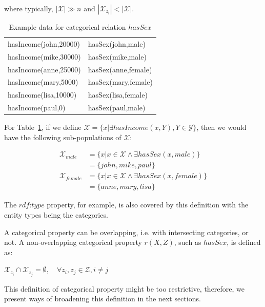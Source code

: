 where typically, $|\mathcal{X}| \gg n$ and  $|\mathcal{X}_{z_i}| < |\mathcal{X}|$.

\begin{table}[h!]
 \begin{center}
 \caption{Example data for categorical relation $hasSex$}
  \begin{tabular}{*{2}{l}}
    \toprule
    hasIncome(john,20000) & hasSex(john,male) 	\\
    hasIncome(mike,30000) & hasSex(mike,male) 	\\
    hasIncome(anne,25000) & hasSex(anne,female) 	\\
    hasIncome(mary,5000)  & hasSex(mary,female) 	\\
    hasIncome(lisa,10000) & hasSex(lisa,female)	\\
    hasIncome(paul,0)	  & hasSex(paul,male)	\\
    \bottomrule
  \end{tabular}
 \label{tab:cat1}
 \end{center}

\end{table}
  
For Table~\ref{tab:cat1}, if we define $\mathcal{X}=\{ x|\exists hasIncome(x,Y), Y \in \mathcal{Y} \}$, then we
would have the following sub-populations of $\mathcal{X}$:

\begin{align*}
 \mathcal{X}_{male}&=\{ x|x \in \mathcal{X} \wedge \exists hasSex(x,male)\} \\
  &=\{john,mike,paul\} \\
\mathcal{X}_{female}&=\{ x|x \in \mathcal{X} \wedge \exists hasSex(x,female)\} \\
  &=\{anne,mary,lisa\}
\end{align*}


The $rdf$:$type$ property, for example, is also covered by this definition with the entity types being the categories.

A categorical property can be overlapping, i.e. with intersecting categories, or not. A non-overlapping categorical
property $r(X,Z)$, such as $hasSex$, is defined as:

\begin{center}
$\mathcal{X}_{z_i} \cap \mathcal{X}_{z_j} = \emptyset, \quad \forall z_i,z_j \in \mathcal{Z}, i \neq j$ 
\end{center}

This definition of categorical property might be too restrictive, therefore, we present ways of broadening this
definition in the next sections.

